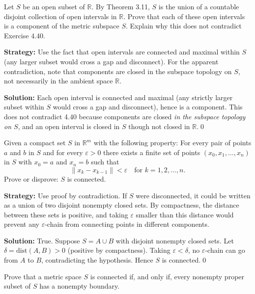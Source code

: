 \begin{problembox}
Let $S$ be an open subset of $\mathbb{R}$. By Theorem 3.11, $S$ is the union of a countable disjoint collection of open intervals in $\mathbb{R}$. Prove that each of these open intervals is a component of the metric subspace $S$. Explain why this does not contradict Exercise 4.40.
\end{problembox}

\noindent\textbf{Strategy:} Use the fact that open intervals are connected and maximal within $S$ (any larger subset would cross a gap and disconnect). For the apparent contradiction, note that components are closed in the subspace topology on $S$, not necessarily in the ambient space $\mathbb{R}$.

\bigskip\noindent\textbf{Solution:}
Each open interval is connected and maximal (any strictly larger subset within $S$ would cross a gap and disconnect), hence is a component. This does not contradict 4.40 because components are closed \emph{in the subspace topology on $S$}, and an open interval is closed in $S$ though not closed in $\mathbb{R}$.\qed



\begin{problembox}
Given a compact set $S$ in $\mathbb{R}^m$ with the following property: For every pair of points $a$ and $b$ in $S$ and for every $\varepsilon > 0$ there exists a finite set of points $(x_0, x_1, \ldots, x_n)$ in $S$ with $x_0 = a$ and $x_n = b$ such that
\[\|x_k - x_{k-1}\| < \varepsilon \quad \text{for } k = 1, 2, \ldots, n.\]
Prove or disprove: $S$ is connected.
\end{problembox}

\noindent\textbf{Strategy:} Use proof by contradiction. If $S$ were disconnected, it could be written as a union of two disjoint nonempty closed sets. By compactness, the distance between these sets is positive, and taking $\varepsilon$ smaller than this distance would prevent any $\varepsilon$-chain from connecting points in different components.

\bigskip\noindent\textbf{Solution:}
True. Suppose $S=A\cup B$ with disjoint nonempty closed sets. Let $\delta=\mathrm{dist}(A,B)>0$ (positive by compactness). Taking $\varepsilon<\delta$, no $\varepsilon$-chain can go from $A$ to $B$, contradicting the hypothesis. Hence $S$ is connected.\qed



\begin{problembox}
Prove that a metric space $S$ is connected if, and only if, every nonempty proper subset of $S$ has a nonempty boundary.
\end{problembox}

